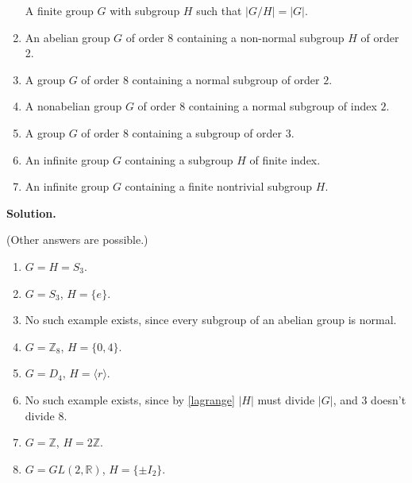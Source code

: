 \documentclass[10pt,]{book}
\theoremstyle{plain}
\theoremstyle{definition}
\theoremstyle{definition}
\theoremstyle{definition}
\theoremstyle{definition}
\numberwithin{equation}{section}
\def\Z{\mathbb{Z}}
\def\R{\mathbb{R}}
\begin{document}
\begin{exerciselist}
\begin{enumerate}[label=(\alph*)]
              A finite group \(G\) with subgroup \(H\) such that \(|G/H|=|G|\).
\item\hypertarget{li-447}{}
              An abelian group \(G\) of order \(8\) containing a non-normal subgroup \(H\) of order 2.
\item\hypertarget{li-448}{}
              A group \(G\) of order 8 containing a normal subgroup of order \(2\).
\item\hypertarget{li-449}{}
              A nonabelian group \(G\) of order 8 containing a normal subgroup of index \(2\).
\item\hypertarget{li-450}{}
              A group \(G\) of order 8 containing a subgroup of order \(3\).
\item\hypertarget{li-451}{}
              An infinite group \(G\) containing a subgroup \(H\) of finite index.
\item\hypertarget{li-452}{}
              An infinite group \(G\) containing a finite nontrivial subgroup \(H\).
\end{enumerate}

\par\smallskip
\par\smallskip
\noindent\textbf{Solution.}\hypertarget{solution-54}{}\quad

      (Other answers are possible.)
      \leavevmode%
\begin{enumerate}[label=(\alph*)]
\item\hypertarget{li-453}{}
            \(G=H=S_3\).
\item\hypertarget{li-454}{}
            \(G=S_3\), \(H=\{e\}\).
\item\hypertarget{li-455}{}
            No such example exists, since every subgroup of an abelian group is normal.
\item\hypertarget{li-456}{}
            \(G=\Z_8\), \(H=\{0,4\}\).
\item\hypertarget{li-457}{}
            \(G=D_4\), \(H=\langle r\rangle\).
\item\hypertarget{li-458}{}
            No such example exists, since by \hyperref[lagrange]{\ref{lagrange}} \(|H|\) must divide \(|G|\), and 3 doesn't divide 8.
\item\hypertarget{li-459}{}
            \(G=\Z\), \(H=2\Z\).
\item\hypertarget{li-460}{}
            \(G=GL(2,\R)\), \(H=\{\pm I_2\}\).
\end{enumerate}


\end{exerciselist}
\end{document}
